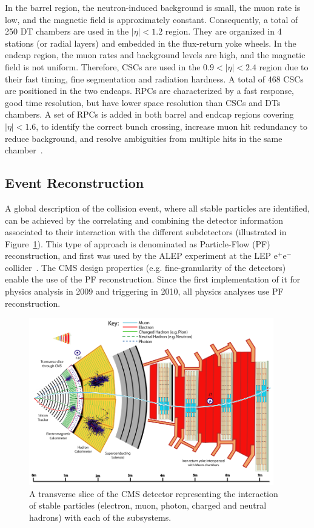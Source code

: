 In the barrel region, the neutron-induced background is small, the muon rate is low, and the magnetic field is approximately constant. Consequently, a total of 250 DT chambers are used in the $|\eta|<1.2$ region. They are organized in 4 stations (or radial layers) and embedded in the flux-return yoke wheels. In the endcap region, the muon rates and background levels are high, and the magnetic field is not uniform. Therefore, CSCs are used in the $0.9<|\eta|<2.4$ region due to their fast timing, fine segmentation and radiation hardness. A total of 468 CSCs are positioned in the two endcaps. RPCs are characterized by a fast response, good time resolution, but have lower space resolution than CSCs and DTs chambers. A set of RPCs is added in both barrel and endcap regions covering $|\eta|<1.6$, to identify the correct bunch crossing, increase muon hit redundancy to reduce background, and resolve ambiguities from multiple hits in the same chamber~\cite{CMS:2008xjf,CMS:2006myw}. 

\subsection{Event Reconstruction}

A global description of the collision event, where all stable particles are identified, can be achieved by the correlating and combining the detector information associated to their interaction with the different subdetectors (illustrated in Figure~\ref{fig:cmspfslice}). This type of approach is denominated as Particle-Flow (PF) reconstruction, and first was used by the ALEP experiment at the LEP $\mathrm{e^{+}e^{-}}$ collider~\cite{alephpf}. The CMS design properties (e.g. fine-granularity of the detectors) enable the use of the PF reconstruction. Since the first implementation of it for physics analysis in 2009 and triggering in 2010, all physics analyses use PF reconstruction. 

\begin{figure}[ht!]
\centering
\includegraphics[width=0.95\textwidth]{Figures/Apparatus/cmspfslice.png}
\caption[A transverse slice of the CMS detector representing the interaction of stable particles]{A transverse slice of the CMS detector representing the interaction of stable particles (electron, muon, photon, charged and neutral hadrons) with each of the subsystems.}
\label{fig:cmspfslice}
\end{figure}

